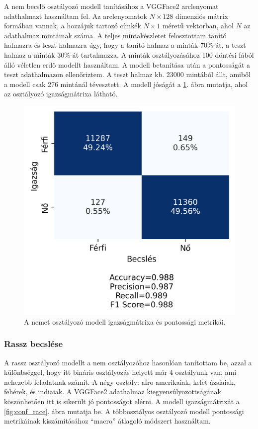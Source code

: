 A nem becslő osztályozó modell tanításához a VGGFace2 arclenyomat adathalmazt használtam fel. Az arclenyomatok $N\times128$ dimenziós mátrix formában vannak, a hozzájuk tartozó címkék $N\times1$ méretű vektorban, ahol $N$ az adathalmaz mintáinak száma. A teljes mintakészletet felosztottam tanító halmazra és teszt halmazra úgy, hogy a tanító halmaz a minták 70\%-át, a teszt halmaz a minták 30\%-át tartalmazza. A minták osztályozásához 100 döntési fából álló véletlen erdő modellt használtam. A modell betanítása után a pontosságát a teszt adathalmazon ellenőriztem. A teszt halmaz kb. 23000 mintából állt, amiből a modell csak 276 mintánál tévesztett. A modell jóságát a \ref{fig:conf_sex}. ábra mutatja, ahol az osztályozó igazságmátrixa látható. 
\begin{figure}[ht]
	\centering
	\includegraphics[width=0.55\columnwidth]{figures/conf_sex.png}
	\caption{A nemet osztályozó modell igazságmátrixa és pontossági metrikái.}
	\label{fig:conf_sex}
\end{figure}

\subsubsection*{Rassz becslése}
A rassz osztályozó modellt a nem osztályozóhoz hasonlóan tanítottam be, azzal a különbséggel, hogy itt bináris osztályozás helyett már 4 osztályunk van, ami nehezebb feladatnak számít. A négy osztály: afro amerikaiak, kelet ázsiaiak, fehérek, és indiaiak. A VGGFace2 adathalmaz kiegyensúlyozottságának köszönhetően itt is sikerült jó pontosságot elérni. A modell igazságmátrixát a \ref{fig:conf_race}. ábra mutatja be. A többosztályos osztályozó modell pontossági metrikáinak kiszámításához ``macro'' átlagoló módszert használtam.

